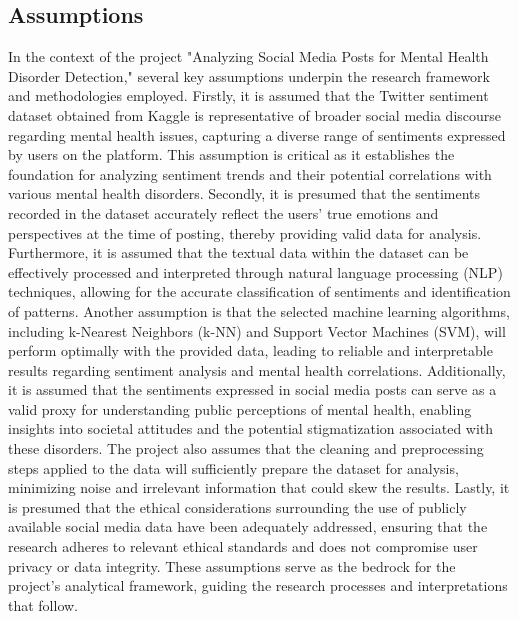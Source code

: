 \subsection{Assumptions}
\noindent
In the context of the project "Analyzing Social Media Posts for Mental Health Disorder Detection," several key assumptions underpin the research framework and methodologies employed. Firstly, it is assumed that the Twitter sentiment dataset obtained from Kaggle is representative of broader social media discourse regarding mental health issues, capturing a diverse range of sentiments expressed by users on the platform. This assumption is critical as it establishes the foundation for analyzing sentiment trends and their potential correlations with various mental health disorders. Secondly, it is presumed that the sentiments recorded in the dataset accurately reflect the users' true emotions and perspectives at the time of posting, thereby providing valid data for analysis. Furthermore, it is assumed that the textual data within the dataset can be effectively processed and interpreted through natural language processing (NLP) techniques, allowing for the accurate classification of sentiments and identification of patterns. Another assumption is that the selected machine learning algorithms, including k-Nearest Neighbors (k-NN) and Support Vector Machines (SVM), will perform optimally with the provided data, leading to reliable and interpretable results regarding sentiment analysis and mental health correlations. Additionally, it is assumed that the sentiments expressed in social media posts can serve as a valid proxy for understanding public perceptions of mental health, enabling insights into societal attitudes and the potential stigmatization associated with these disorders. The project also assumes that the cleaning and preprocessing steps applied to the data will sufficiently prepare the dataset for analysis, minimizing noise and irrelevant information that could skew the results. Lastly, it is presumed that the ethical considerations surrounding the use of publicly available social media data have been adequately addressed, ensuring that the research adheres to relevant ethical standards and does not compromise user privacy or data integrity. These assumptions serve as the bedrock for the project's analytical framework, guiding the research processes and interpretations that follow.




